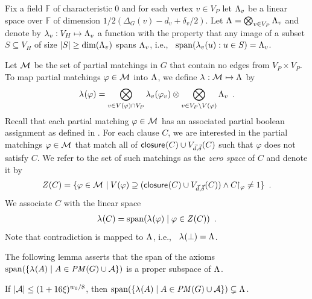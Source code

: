 \documentclass{theoretics}
\newcommand{\set}[1]{\{ #1 \}}
\newcommand{\setdescr}[3][\mid]{\set{ #2 #1 #3 }}
\newcommand{\setsize}[1]{\lvert#1\rvert}
\newcommand{\introduceterm}[1]{{\emph{#1}}}
\newcommand{\eqperiod}{\enspace .}
\newcommand{\ie}{i.e.,\ }
\newcommand{\clc}{\ensuremath{C}}
\newcommand{\restrict}[2]{{{#1}\!\!\upharpoonright_{#2}}}
\newcommand{\formulaformat}[1]{\mathit{#1}}
\newcommand{\PM}{PM(G)}
\renewcommand{\PM}{\formulaformat{PM}(G)}
\renewcommand{\deg}[2][XXXXXXXXXXXX]{\Delta_{#1}(#2)}
\newcommand{\diff}{\xi}
\newcommand{\ontodimLi}{1/2(\deg[G]{v} - d_v + \delta_v/2)}
\newcommand{\V}[1][]{V_{#1}}
\newcommand{\Vp}{\V[P]}
\newcommand{\Vh}{\V[H]}
\newcommand{\Ax}{\ensuremath\mathcal{A}}
\newcommand{\vecthr}{\vec{d}}
\newcommand{\vecadv}{\vec{\delta}}
\newcommand{\linspace}[1][]{\ensuremath \Lambda_{{#1}}}
\newcommand{\linmap}[1][]{\ensuremath \lambda_{{#1}}}
\newcommand{\linmapof}[2][]{\linmap[#1](#2)}
\newcommand{\Vthick}[1]{\ensuremath V_{\vecthr,\vecadv}(#1)}
\newcommand{\closure}[2][]{\mathsf{closure}_{{#1}}(#2)}
\newcommand{\vmatch}[1]{V(#1)}
\newcommand{\matcha}{\varphi}
\newcommand{\matchings}[1][]{\ensuremath \mathcal{M}_{{#1}}}
\newcommand{\Null}[1]{\ensuremath Z(#1)}
\newcommand{\spans}[1]{\mathrm{span} ( #1 )}
\newcommand{\tensor}{\ensuremath \otimes}
\newcommand{\bigtensor}{\ensuremath \bigotimes}
\numberwithin{equation}{section}
\begin{document}
  Fix a field $\mathbb{F}$ of characteristic 0 and 
  for each vertex $v \in \Vp$ let $\linspace[v]$ be a linear space over $\mathbb{F}$ of 
  dimension $\ontodimLi$. Let
  $\linspace = \bigtensor_{v \in \Vp} \linspace[v]$ and denote by
  $\linmap[v]: \Vh \mapsto \linspace[v]$ a function with the 
  property that any image of a subset 
  $S \subseteq \Vh$ of size $\setsize{S} \ge \dim(\linspace[v])$ 
  spans $\linspace[v]$, \ie
  $\spans{\linmapof[v]{u} : u \in S} = \linspace[v]$.

  Let $\matchings$ be the set of partial matchings in $G$ that contain
  no edges from $\Vp \times \Vp$. To map partial matchings 
  $\matcha \in \matchings$ into $\linspace$,
  we define
  $\linmap : \matchings \mapsto \linspace$ by
  \begin{align}\label{eq:onto_lambda_def}
    \linmapof{\matcha} = 
    \bigtensor_{v \in \vmatch{\matcha} \cap \Vp} \linmapof[v]{\matcha_v} \tensor 
    \bigtensor_{ v \in \Vp \setminus \vmatch{\matcha}} \linspace[v] \eqperiod
  \end{align}
  Recall that each partial matching $\matcha \in \matchings$ has an
  associated partial boolean assignment as defined in
  .  For each clause $C$, we are
  interested in the partial matchings $\matcha \in \matchings$ that
  match all of $\closure{C} \cup \Vthick{C}$ such that
  ${\matcha}$ does not satisfy $C$. We refer to the set of
  such matchings as the \introduceterm{zero space} of $\clc$ and
  denote it by
  \begin{align}
    \Null{C} = \set{\matcha \in \matchings \mid 
    \vmatch{\matcha} \supseteq (\closure{C} \cup \Vthick{C}) 
    \wedge \restrict{C}{\matcha}\neq 1} \eqperiod
  \end{align}
  We associate $C$ with the linear space
  \begin{align}
    \linmapof{C} = \spans{ \linmapof{\matcha} \mid \matcha \in \Null{C}} 
    \eqperiod
  \end{align}
  Note that contradiction is mapped to $\linspace$, \ie
  $\linmapof{\bot} = \linspace$.
  
  The following lemma asserts that the span of the axioms
  $\spans{\setdescr{\linmapof{A}}{A \in \PM \cup \Ax}}$
  is a proper subspace of $\linspace$.
  
  \begin{lemma}\label{lem:onto_subspace}
    If $\setsize{\Ax} \le (1 + 16 \diff)^{w_0/8}$, then
    $\spans{\setdescr{\linmapof{A}}{A \in \PM \cup \Ax}} \subsetneq \linspace$.
  \end{lemma}
  
\end{document}
